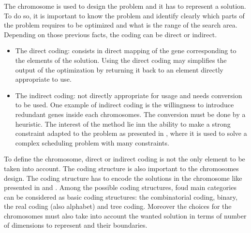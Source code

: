 The chromosome is used to design the problem and it has to represent a solution. To do so, it is important to know the problem and identify clearly which parts of the problem requires to be optimized and what is the range of the search area. \\
Depending on those previous facts, the coding can be direct or indirect.
\begin{itemize}
\item The direct coding: consists in direct mapping of the gene corresponding to the elements of the solution. Using the direct coding may simplifies the output of the optimization by returning it back to an element directly appropriate to use.
\item  The indirect coding: not directly appropriate for usage and needs conversion to be used. One example of indirect coding is the willingness to introduce redundant genes inside each chromosomes.  The conversion must be done by a heuristic. The interest of the method lie inn the ability  to make a strong constraint adapted to the problem as presented in \cite{121*ronald1997,131*walters1995}, where it is used to solve a complex scheduling problem with many constraints. 
\end{itemize} 
To define the chromosome, direct or indirect coding is not the only element to be taken into account. The coding structure is also important to the chromosomes design. The coding structure has to encode the solutions in the chromosome like presented in \cite{131*walters1995} and \cite{123*owais2008}. Among the possible coding structures, foud main categories can be considered as basic coding structures: the combinatorial  coding, binary, the real coding (also alphabet) and tree coding. Moreover the choices for the chromosomes must also take into account the wanted solution in terms of number of dimensions to represent and their boundaries.

